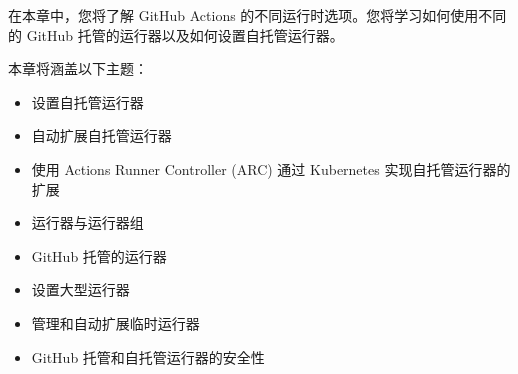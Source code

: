 在本章中，您将了解 GitHub Actions 的不同运行时选项。您将学习如何使用不同的 GitHub 托管的运行器以及如何设置自托管运行器。

本章将涵盖以下主题：

\begin{itemize}
\item 
设置自托管运行器

\item 
自动扩展自托管运行器

\item 
使用 Actions Runner Controller (ARC) 通过 Kubernetes 实现自托管运行器的扩展

\item 
运行器与运行器组

\item 
GitHub 托管的运行器

\item 
设置大型运行器

\item 
管理和自动扩展临时运行器

\item 
GitHub 托管和自托管运行器的安全性
\end{itemize}